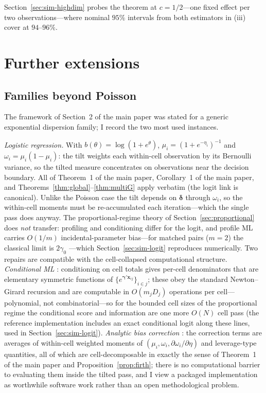 \documentclass[11pt]{article}
\newcommand{\bgamma}{\bm{\gamma}}
\newcommand{\bdelta}{\bm{\delta}}
\newcommand{\bx}{\mathbf{x}}
\begin{document}
Section~\ref{sec:sim-highdim} probes the theorem at $c = 1/2$---one
fixed effect per two observations---where nominal $95\%$ intervals from
both estimators in (iii) cover at $94$--$96\%$.

\section{Further extensions}\label{sec:extensions}

\subsection{Families beyond Poisson}\label{sec:families}

The framework of Section~2 of the main paper was stated for a generic
exponential dispersion family; I record the two most used instances.

\emph{Logistic regression.}  With $b(\theta) = \log(1 + e^{\theta})$,
$\mu_i = (1+e^{-\eta_i})^{-1}$ and $\omega_i = \mu_i(1-\mu_i)$: the tilt
weights each within-cell observation by its Bernoulli variance, so the
tilted measure concentrates on observations near the decision boundary.
All of Theorem~1 of the main paper, Corollary~1 of the main paper, and
Theorems~\ref{thm:global}--\ref{thm:multiG} apply verbatim (the logit
link is canonical).  Unlike the Poisson case the tilt depends on
$\bdelta$ through $\omega_i$, so the within-cell moments must be
re-accumulated each iteration---which the single pass does anyway.  The
proportional-regime theory of Section~\ref{sec:proportional} does
\emph{not} transfer: profiling and conditioning differ for the logit,
and profile ML carries $O(1/m)$ incidental-parameter bias---for matched
pairs ($m = 2$) the classical limit is $2\gamma_0$
\citep{andersen1970}---which Section~\ref{sec:sim-logit} reproduces
numerically.  Two repairs are compatible with the cell-collapsed
computational structure.  \emph{Conditional ML}
\citep{chamberlain1980}: conditioning on cell totals gives per-cell
denominators that are elementary symmetric functions of
$\{e^{\bgamma'\bx_{ij}}\}_{i \in j}$; these obey the standard
Newton--Girard recursion and are computable in $O(m_j D_j)$ operations
per cell---polynomial, not combinatorial---so for the bounded cell sizes
of the proportional regime the conditional score and information are one
more $O(N)$ cell pass (the reference implementation includes an exact
conditional logit along these lines, used in
Section~\ref{sec:sim-logit}).  \emph{Analytic bias correction}
\citep{hahn2004,fernandezval2016}: the correction terms are averages of
within-cell weighted moments of $(\mu_i, \omega_i,
\partial\omega_i/\partial\eta)$ and leverage-type quantities, all of
which are cell-decomposable in exactly the sense of
Theorem~1 of the main paper and Proposition~\ref{prop:firth}; there is no
computational barrier to evaluating them inside the tilted pass, and I
view a packaged implementation as worthwhile software work rather than
an open methodological problem.
\end{document}
